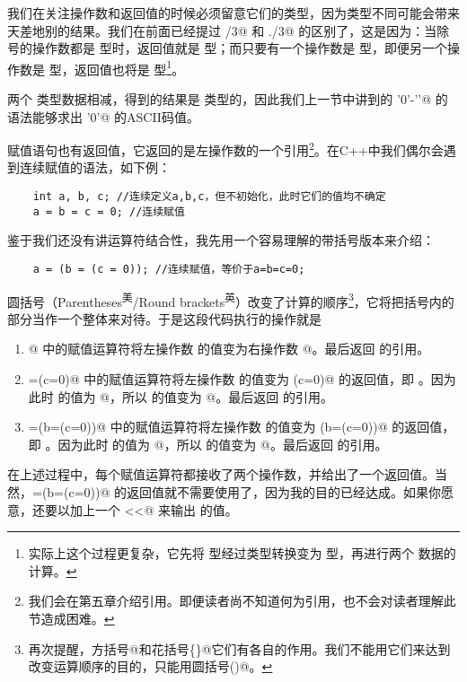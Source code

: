 我们在关注操作数和返回值的时候必须留意它们的类型，因为类型不同可能会带来天差地别的结果。我们在前面已经提过 /3@ 和 ./3@ 的区别了，这是因为：当除号的操作数都是 \lstinline@int@ 型时，返回值就是 \lstinline@int@ 型；而只要有一个操作数是 \lstinline@double@ 型，即便另一个操作数是 \lstinline@int@ 型，返回值也将是 \lstinline@double@ 型\footnote{实际上这个过程更复杂，它先将 \lstinline@int@ 型经过类型转换变为 \lstinline@double@ 型，再进行两个 \lstinline@double@ 数据的计算。}。\par
两个 \lstinline@char@ 类型数据相减，得到的结果是 \lstinline@int@ 类型的，因此我们上一节中讲到的 \lstinline@'0'-'\0'@ 的语法能够求出 \lstinline@'0'@ 的ASCII码值。\par
赋值语句也有返回值，它返回的是左操作数的一个引用\footnote{我们会在第五章介绍引用。即便读者尚不知道何为引用，也不会对读者理解此节造成困难。}。在C++中我们偶尔会遇到连续赋值的语法，如下例：
\begin{lstlisting}
    int a, b, c; //连续定义a,b,c，但不初始化，此时它们的值均不确定
    a = b = c = 0; //连续赋值
\end{lstlisting}
鉴于我们还没有讲运算符结合性，我先用一个容易理解的带括号版本来介绍：
\begin{lstlisting}
    a = (b = (c = 0)); //连续赋值，等价于a=b=c=0;
\end{lstlisting}
圆括号（Parentheses\textsuperscript{美}/Round brackets\textsuperscript{英}）改变了计算的顺序\footnote{再次提醒，方括号\lstinline@[]@和花括号\lstinline@\{\}@它们有各自的作用。我们不能用它们来达到改变运算顺序的目的，只能用圆括号\lstinline@()@。}，它将把括号内的部分当作一个整体来对待。于是这段代码执行的操作就是
\begin{enumerate}
    \item {}@ 中的赋值运算符将左操作数 \lstinline@c@ 的值变为右操作数 @。最后返回 \lstinline@c@ 的引用。
    \item \lstinline@b=(c=0)@ 中的赋值运算符将左操作数 \lstinline@b@ 的值变为 \lstinline@(c=0)@ 的返回值，即 \lstinline@c@ 。因为此时 \lstinline@c@ 的值为 @，所以 \lstinline@b@ 的值变为 @。最后返回 \lstinline@b@ 的引用。
    \item \lstinline@a=(b=(c=0))@ 中的赋值运算符将左操作数 \lstinline@a@ 的值变为 \lstinline@(b=(c=0))@ 的返回值，即 \lstinline@b@。因为此时 \lstinline@b@ 的值为 @，所以 \lstinline@a@ 的值变为 @。最后返回 \lstinline@a@ 的引用。
\end{enumerate}
在上述过程中，每个赋值运算符都接收了两个操作数，并给出了一个返回值。当然，\lstinline@a=(b=(c=0))@ 的返回值就不需要使用了，因为我的目的已经达成。如果你愿意，还要以加上一个 \lstinline@cout<<@ 来输出 \lstinline@a@ 的值。
